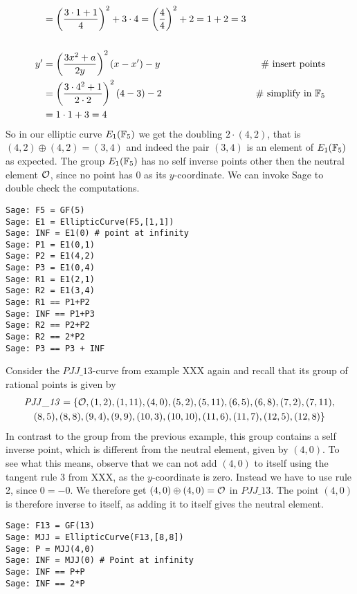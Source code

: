 \begin{example}
\begin{align*}
    & = \left(\frac{3\cdot 1+1}{4}\right)^2 +3\cdot 4
      = \left(\frac{4}{4}\right)^2 +2
      = 1 +2 
      = 3
\\
\\
y'  & = \left(\frac{3x^2+a}{2y}\right)^2\left(x-x'\right) - y  & \text{\# insert points} \\
    & = \left(\frac{3\cdot 4^2+1}{2\cdot 2}\right)^2\left(4-3\right) - 2 & \text{\# simplify in } \mathbb{F}_5\\
    & = 1\cdot 1 + 3
      = 4
\end{align*}
So in our elliptic curve $E_1(\mathbb{F}_5)$ we get the doubling $2\cdot (4,2)$, that is $(4,2)\oplus (4,2) =(3,4)$ and indeed the pair $(3,4)$ is an element of $E_1(\mathbb{F}_5)$ as expected. The group $E_1(\mathbb{F}_5)$ has no self inverse points other then the neutral element $\mathcal{O}$, since no point has $0$ as its $y$-coordinate. We can invoke Sage to double check the computations. 
\begin{verbatim}
Sage: F5 = GF(5)
Sage: E1 = EllipticCurve(F5,[1,1])
Sage: INF = E1(0) # point at infinity
Sage: P1 = E1(0,1)
Sage: P2 = E1(4,2)
Sage: P3 = E1(0,4)
Sage: R1 = E1(2,1)
Sage: R2 = E1(3,4)
Sage: R1 == P1+P2
Sage: INF == P1+P3
Sage: R2 == P2+P2
Sage: R2 == 2*P2
Sage: P3 == P3 + INF
\end{verbatim}
\end{example}
\begin{example} Consider the $\mathit{PJJ\_13}$-curve from example XXX again and recall that its group of rational points is given by 
\begin{multline*}
\mathit{PJJ\_13} = \{\mathcal{O}, (1, 2), (1, 11), (4, 0), (5, 2), (5, 11), (6, 5), (6, 8), (7,2), (7, 11), \\ (8, 5), (8, 8), (9, 4), (9, 9), (10, 3), (10,
10), (11, 6), (11, 7), (12, 5), (12, 8)\}
\end{multline*}
In contrast to the group from the previous example, this group contains a self inverse point, which is different from the neutral element, given by $(4,0)$. To see what this means, observe that we can not add $(4,0)$ to itself using the tangent rule 3 from XXX, as the $y$-coordinate is zero. Instead we have to use rule 2, since $0=-0$. We therefore get $(4,0)\oplus (4,0)=\mathcal{O}$ in $\mathit{PJJ\_13}$. The point $(4,0)$ is therefore inverse to itself, as adding it to itself gives the neutral element. 
\begin{verbatim}
Sage: F13 = GF(13)
Sage: MJJ = EllipticCurve(F13,[8,8])
Sage: P = MJJ(4,0)
Sage: INF = MJJ(0) # Point at infinity
Sage: INF == P+P
Sage: INF == 2*P
\end{verbatim}
\end{example}
